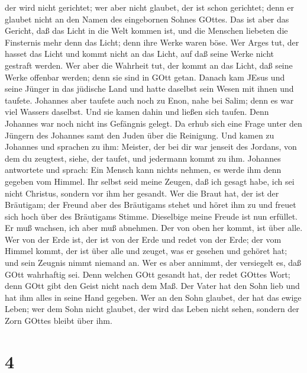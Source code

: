 der wird nicht gerichtet; wer aber nicht glaubet, der ist schon
gerichtet; denn er glaubet nicht an den Namen des eingebornen Sohnes
GOttes.  Das ist aber das Gericht, daß das Licht in die
Welt kommen ist, und die Menschen liebeten die Finsternis mehr denn das
Licht; denn ihre Werke waren böse.  Wer Arges tut, der
hasset das Licht und kommt nicht an das Licht, auf daß seine Werke nicht
gestraft werden.  Wer aber die Wahrheit tut, der kommt an
das Licht, daß seine Werke offenbar werden; denn sie sind in GOtt getan.
 Danach kam JEsus und seine Jünger in das jüdische Land und
hatte daselbst sein Wesen mit ihnen und taufete.  Johannes
aber taufete auch noch zu Enon, nahe bei Salim; denn es war viel Wassers
daselbst. Und sie kamen dahin und ließen sich taufen.  Denn
Johannes war noch nicht ins Gefängnis gelegt.  Da erhub
sich eine Frage unter den Jüngern des Johannes samt den Juden über die
Reinigung.  Und kamen zu Johannes und sprachen zu ihm:
Meister, der bei dir war jenseit des Jordans, von dem du zeugtest,
siehe, der taufet, und jedermann kommt zu ihm.  Johannes
antwortete und sprach: Ein Mensch kann nichts nehmen, es werde ihm denn
gegeben vom Himmel.  Ihr selbst seid meine Zeugen, daß ich
gesagt habe, ich sei nicht Christus, sondern vor ihm her gesandt.
 Wer die Braut hat, der ist der Bräutigam; der Freund aber
des Bräutigams stehet und höret ihm zu und freuet sich hoch über des
Bräutigams Stimme. Dieselbige meine Freude ist nun erfüllet.
 Er muß wachsen, ich aber muß abnehmen.  Der
von oben her kommt, ist über alle. Wer von der Erde ist, der ist von der
Erde und redet von der Erde; der vom Himmel kommt, der ist über alle
 und zeuget, was er gesehen und gehöret hat; und sein
Zeugnis nimmt niemand an.  Wer es aber annimmt, der
versiegelt es, daß GOtt wahrhaftig sei.  Denn welchen GOtt
gesandt hat, der redet GOttes Wort; denn GOtt gibt den Geist nicht nach
dem Maß.  Der Vater hat den Sohn lieb und hat ihm alles in
seine Hand gegeben.  Wer an den Sohn glaubet, der hat das
ewige Leben; wer dem Sohn nicht glaubet, der wird das Leben nicht sehen,
sondern der Zorn GOttes bleibt über ihm.

\hypertarget{section-3}{%
\section{4}\label{section-3}}


